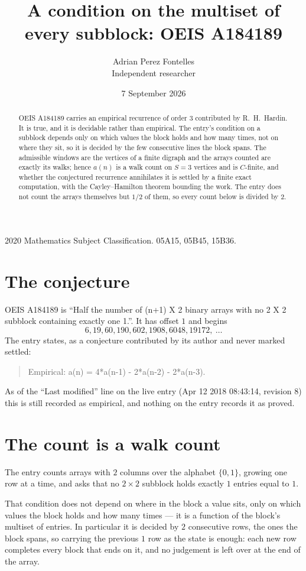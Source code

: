 \documentclass[11pt,a4paper]{article}
\title{A condition on the multiset of every subblock: OEIS A184189}
\author{Adrian Perez Fontelles\\ \small Independent researcher}
\date{7 September 2026}
\theoremstyle{plain}
\theoremstyle{definition}
\begin{document}
\maketitle

\begin{abstract}
OEIS A184189 carries an empirical recurrence of order $3$ contributed by R.~H.~Hardin. It is
true, and it is decidable rather than empirical. The entry's condition on a subblock depends
only on which values the block holds and how many times, not on where they sit, so it is
decided by the few consecutive lines the block spans. The admissible windows are the vertices
of a finite digraph and the arrays counted are exactly its walks; hence $a(n)$ is a walk count
on $S=3$ vertices and is $C$-finite, and whether the conjectured recurrence annihilates it
is settled by a finite exact computation, with the Cayley--Hamilton theorem bounding the
work. The entry does not count the arrays themselves but $1/2$ of them, so every count below is divided by $2$.
\end{abstract}

\noindent\small 2020 Mathematics Subject Classification. 05A15, 05B45, 15B36.\normalsize

\section{The conjecture}

OEIS A184189 is ``Half the number of (n+1) X 2 binary arrays with no 2 X 2 subblock containing exactly one 1.''. It has offset $1$ and begins
\[
6, 19, 60, 190, 602, 1908, 6048, 19172,\ \dots
\]
The entry states, as a conjecture contributed by its author and never marked settled:
\begin{quote}
Empirical: a(n) = 4*a(n-1) - 2*a(n-2) - 2*a(n-3).
\end{quote}
As of the ``Last modified'' line on the live entry (Apr 12 2018 08:43:14, revision 8) this is still
recorded as empirical, and nothing on the entry records it as proved.

\section{The count is a walk count}

The entry counts arrays with $2$ columns over the alphabet $\{0,1\}$, growing one row at a time, and asks that no $2\times2$ subblock holds exactly $1$ entries equal to $1$.

That condition does not depend on where in the block a value sits, only on which values the block holds and how many times --- it is a function of the block's multiset of entries. In particular it is decided by $2$ consecutive rows, the ones the block spans, so carrying the previous $1$ row as the state is enough: each new row completes every block that ends on it, and no judgement is left over at the end of the array.
\end{document}
